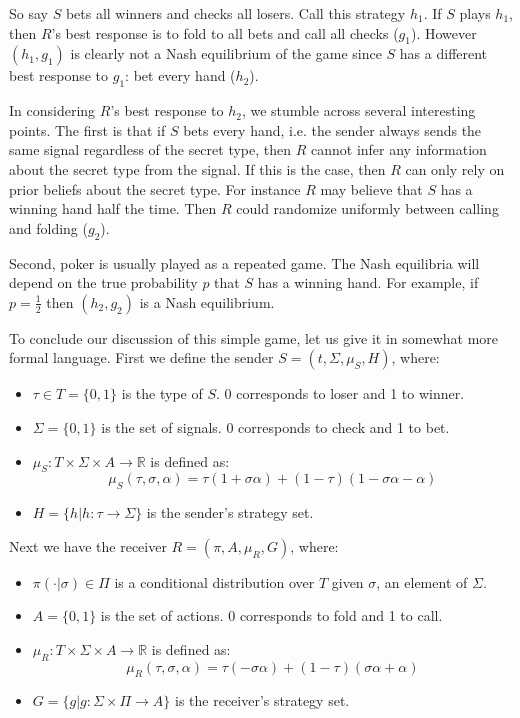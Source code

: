 \documentclass{article}
\begin{document}
So say $S$ bets all winners and checks all losers. Call this strategy $h_1$. If $S$ plays $h_1$, then $R$'s best response is to fold to all bets and call all checks ($g_1$). However $(h_1, g_1)$ is clearly not a Nash equilibrium of the game since $S$ has a different best response to $g_1$: bet every hand ($h_2$).

In considering $R$'s best response to $h_2$, we stumble across several interesting points. The first is that if $S$ bets every hand, i.e. the sender always sends the same signal regardless of the secret type, then $R$ cannot infer any information about the secret type from the signal. If this is the case, then $R$ can only rely on prior beliefs about the secret type. For instance $R$ may believe that $S$ has a winning hand half the time. Then $R$ could randomize uniformly between calling and folding ($g_2$).

Second, poker is usually played as a repeated game. The Nash equilibria will depend on the true probability $p$ that $S$ has a winning hand. For example, if $p = \frac{1}{2}$ then $(h_2, g_2)$ is a Nash equilibrium.

To conclude our discussion of this simple game, let us give it in somewhat more formal language. First we define the sender $S = (t, \Sigma, \mu_S, H)$, where:
\begin{itemize}
	\item $\tau \in T = \lbrace 0, 1 \rbrace$ is the type of $S$. 0 corresponds to loser and 1 to winner.
	\item $\Sigma = \lbrace 0, 1 \rbrace$ is the set of signals. 0 corresponds to check and 1 to bet.
	\item $\mu_S: T \times \Sigma \times A \longrightarrow \mathbb{R}$ is defined as:
		\begin{equation}
\mu_S(\tau, \sigma, \alpha) = \tau(1+\sigma\alpha) + (1-\tau)(1-\sigma\alpha-\alpha)
		\end{equation}
	\item $H = \lbrace h | h: \tau \rightarrow \Sigma \rbrace$ is the sender's strategy set.
\end{itemize}

\noindent Next we have the receiver $R = (\pi, A, \mu_R, G)$, where:
\begin{itemize}
	\item $\pi(\cdot|\sigma) \in \Pi$ is a conditional distribution over $T$ given $\sigma$, an element of $\Sigma$.
	\item $A = \lbrace 0, 1 \rbrace$ is the set of actions. 0 corresponds to fold and 1 to call.
	\item $\mu_R: T \times \Sigma \times A \longrightarrow \mathbb{R}$ is defined as:
		\begin{equation}
\mu_R(\tau, \sigma, \alpha) = \tau(-\sigma\alpha) + (1-\tau)(\sigma\alpha+\alpha)
		\end{equation}
	\item $G = \lbrace g | g: \Sigma \times \Pi \rightarrow A \rbrace$ is the receiver's strategy set.
\end{itemize}
\end{document}

